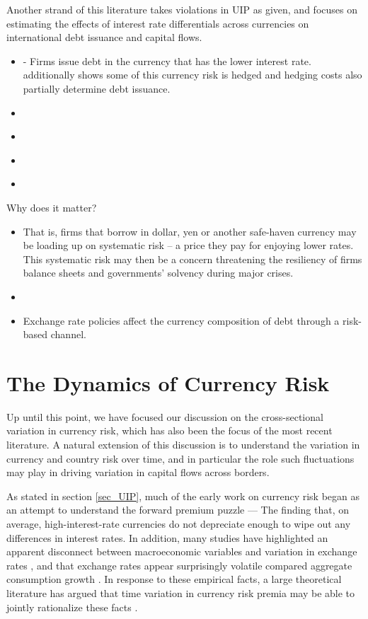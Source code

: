 \documentclass{ar-1col}
\begin{document}
Another strand of this literature takes violations in UIP as given, and focuses on estimating the effects of interest rate differentials across currencies on international debt issuance and capital flows.
\begin{itemize}
    \item \citet{liao2020, Richers2020} - Firms issue debt in the currency that has the lower interest rate. \citet{liao2020} additionally shows some of this currency risk is hedged and hedging costs also partially determine debt issuance.
    \item \citet{KalemliOzcanetal2019}
    \item \citet{KalemliOzcanVarela2019}
    \item \citet{SalomaoVarela2019}
    \item \citet{DuSchreger2016}
\end{itemize}

Why does it matter?
\begin{itemize}
    \item That is, firms that borrow in dollar, yen or another safe-haven currency may be loading up on systematic risk -- a price they pay for enjoying lower rates. This systematic risk may then be a concern threatening the resiliency of firms balance sheets and governments' solvency during major crises.
    \item \citet{cespedes2004balance}
    \item Exchange rate policies affect the currency composition of debt through a risk-based channel.
\end{itemize}

\section{The Dynamics of Currency Risk\label{sec_dynamics}}

Up until this point, we have focused our discussion on the cross-sectional variation in currency risk, which has also been the focus of the most recent literature. A natural extension of this discussion is to understand the variation in currency and country risk over time, and in particular the role such fluctuations may play in driving variation in capital flows across borders.

As stated in section \ref{sec_UIP}, much of the early work on currency risk began as an attempt to understand the forward premium puzzle --- The finding that, on average, high-interest-rate currencies do not depreciate enough to wipe out any differences in interest rates. In addition, many studies have highlighted an apparent disconnect between macroeconomic variables and variation in exchange rates \citep{MeeseRogoff1983}, and that exchange rates appear surprisingly volatile compared aggregate consumption growth \citep{BackusSmith1993}. In response to these empirical facts, a large theoretical literature has argued that time variation in currency risk premia may be able to jointly rationalize these facts \citep{Fama1984,Backusetal2001}.
\end{document}
